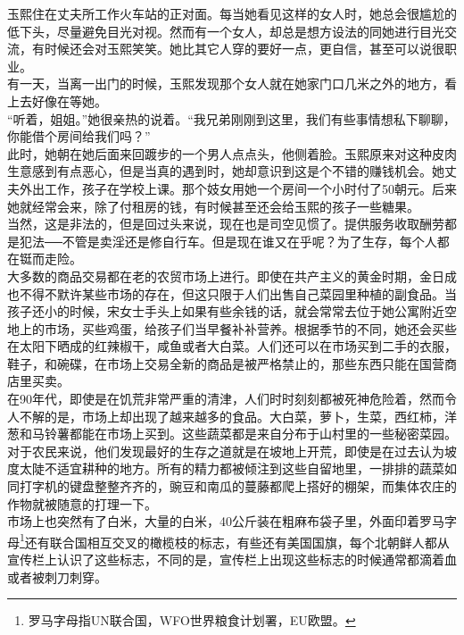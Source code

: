 玉熙住在丈夫所工作火车站的正对面。每当她看见这样的女人时，她总会很尴尬的低下头，尽量避免目光对视。然而有一个女人，却总是想方设法的同她进行目光交流，有时候还会对玉熙笑笑。她比其它人穿的要好一点，更自信，甚至可以说很职业。\\

有一天，当离一出门的时候，玉熙发现那个女人就在她家门口几米之外的地方，看上去好像在等她。\\

“听着，姐姐。”她很亲热的说着。“我兄弟刚刚到这里，我们有些事情想私下聊聊，你能借个房间给我们吗？”\\

此时，她朝在她后面来回踱步的一个男人点点头，他侧着脸。玉熙原来对这种皮肉生意感到有点恶心，但是当真的遇到时，她却意识到这是个不错的赚钱机会。她丈夫外出工作，孩子在学校上课。那个妓女用她一个房间一个小时付了50朝元。后来她就经常会来，除了付租房的钱，有时候甚至还会给玉熙的孩子一些糖果。\\

当然，这是非法的，但是回过头来说，现在也是司空见惯了。提供服务收取酬劳都是犯法──不管是卖淫还是修自行车。但是现在谁又在乎呢？为了生存，每个人都在铤而走险。\\

大多数的商品交易都在老的农贸市场上进行。即使在共产主义的黄金时期，金日成也不得不默许某些市场的存在，但这只限于人们出售自己菜园里种植的副食品。当孩子还小的时候，宋女士手头上如果有些余钱的话，就会常常去位于她公寓附近空地上的市场，买些鸡蛋，给孩子们当早餐补补营养。根据季节的不同，她还会买些在太阳下晒成的红辣椒干，咸鱼或者大白菜。人们还可以在市场买到二手的衣服，鞋子，和碗碟，在市场上交易全新的商品是被严格禁止的，那些东西只能在国营商店里买卖。\\

在90年代，即使是在饥荒非常严重的清津，人们时时刻刻都被死神危险着，然而令人不解的是，市场上却出现了越来越多的食品。大白菜，萝卜，生菜，西红柿，洋葱和马铃薯都能在市场上买到。这些蔬菜都是来自分布于山村里的一些秘密菜园。对于农民来说，他们发现最好的生存之道就是在坡地上开荒，即使是在过去认为坡度太陡不适宜耕种的地方。所有的精力都被倾注到这些自留地里，一排排的蔬菜如同打字机的键盘整整齐齐的，豌豆和南瓜的蔓藤都爬上搭好的棚架，而集体农庄的作物就被随意的打理一下。\\

市场上也突然有了白米，大量的白米，40公斤装在粗麻布袋子里，外面印着罗马字母\footnote{罗马字母指UN联合国，WFO世界粮食计划署，EU欧盟。}还有联合国相互交叉的橄榄枝的标志，有些还有美国国旗，每个北朝鲜人都从宣传栏上认识了这些标志，不同的是，宣传栏上出现这些标志的时候通常都滴着血或者被刺刀刺穿。\\


